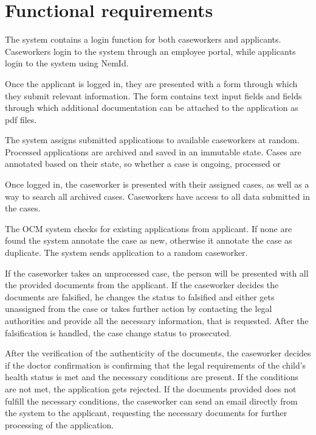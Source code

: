\newpage
\section{Functional requirements}

The system contains a login function for both caseworkers and applicants. Caseworkers login to the system through an employee portal, while applicants login to the system using NemId.

\vspace{2mm}

Once the applicant is logged in, they are presented with a form through which they submit relevant information. The form contains text input fields and fields through which additional documentation can be attached to the application as pdf files.

\vspace{2mm}

The system assigns submitted applications to available caseworkers at random. Processed applications are archived and saved in an immutable state. Cases are annotated based on their state, so whether a case is ongoing, processed or 

Once logged in, the caseworker is presented with their assigned cases, as well as a way to search all archived cases. Caseworkers have access to all data submitted in the cases.

\vspace{2mm}

\vspace{2mm}

The OCM system checks for existing applications from applicant. If none are found the system annotate the case as new, otherwise it annotate the case as duplicate. The system sends application to a random caseworker.

\vspace{2mm}

If the caseworker takes an unprocessed case, the person will be presented with all the provided documents from the applicant. If the caseworker decides the documents are falsified, he changes the status to falsified and either gets unassigned from the case or takes further action by contacting the legal authorities and provide all the necessary information, that is requested. After the falsification is handled, the case change status to prosecuted.

After the verification of the authenticity of the documents, the caseworker decides if the doctor confirmation is confirming that the legal requirements of the child's health status is met and the necessary conditions are present. 
If the conditions are not met, the application gets rejected. 
If the documents provided does not fulfill the necessary conditions, the caseworker can send an email directly from the system to the applicant, requesting the necessary documents for further processing of the application.

